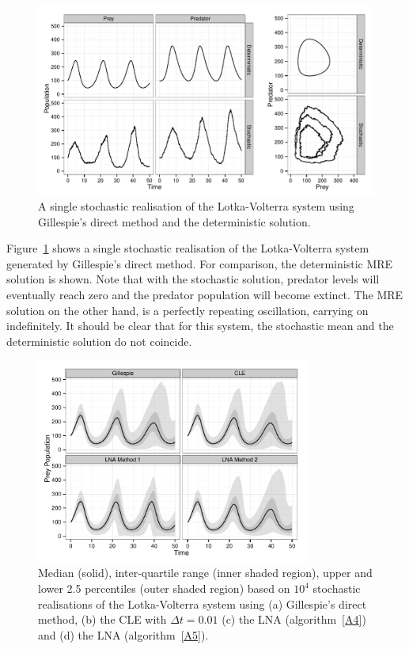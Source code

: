 \documentclass[12pt, DIV12]{scrartcl}
\begin{document}
\begin{figure}[t]
  \centering
  \includegraphics[width=\textwidth]{figure1}
  \caption{A single stochastic realisation of the Lotka-Volterra system using
    Gillespie's direct method and the deterministic solution.}\label{fig:fig1}
\end{figure}
Figure~\ref{fig:fig1} shows a single stochastic realisation of the
Lotka-Volterra system generated by Gillespie's direct method. For comparison,
the deterministic MRE solution is shown. Note that with the stochastic solution,
predator levels will eventually reach zero and the predator population will
become extinct. The MRE solution on the other hand, is a perfectly repeating
oscillation, carrying on indefinitely. It should be clear that for this system,
the stochastic mean and the deterministic solution do not coincide.

\begin{figure}[t]
  \centering
  \includegraphics[width=0.8\textwidth]{figure2}
  \caption{Median (solid), inter-quartile range (inner shaded region), upper and
    lower 2.5 percentiles (outer shaded region) based on $10^4$ stochastic
    realisations of the Lotka-Volterra system using (a) Gillespie's direct
    method, (b) the CLE with $\Delta t=0.01$ (c) the LNA (algorithm~\ref{A4}) and (d)
    the LNA (algorithm~\ref{A5}).}\label{fig:fig2}
\end{figure}
\end{document}
